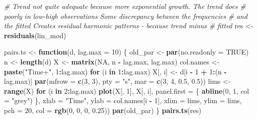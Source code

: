 \documentclass[]{book}
\newenvironment{Shaded}{\begin{snugshade}}{\end{snugshade}}
\newcommand{\CommentTok}[1]{\textcolor[rgb]{0.56,0.35,0.01}{\textit{#1}}}
\newcommand{\ControlFlowTok}[1]{\textcolor[rgb]{0.13,0.29,0.53}{\textbf{#1}}}
\newcommand{\DataTypeTok}[1]{\textcolor[rgb]{0.13,0.29,0.53}{#1}}
\newcommand{\DecValTok}[1]{\textcolor[rgb]{0.00,0.00,0.81}{#1}}
\newcommand{\FloatTok}[1]{\textcolor[rgb]{0.00,0.00,0.81}{#1}}
\newcommand{\KeywordTok}[1]{\textcolor[rgb]{0.13,0.29,0.53}{\textbf{#1}}}
\newcommand{\NormalTok}[1]{#1}
\newcommand{\OperatorTok}[1]{\textcolor[rgb]{0.81,0.36,0.00}{\textbf{#1}}}
\newcommand{\OtherTok}[1]{\textcolor[rgb]{0.56,0.35,0.01}{#1}}
\newcommand{\StringTok}[1]{\textcolor[rgb]{0.31,0.60,0.02}{#1}}
\begin{document}
\begin{Shaded}
\begin{Highlighting}[]
\CommentTok{# Trend not quite adequate because more exponential growth.  The trend does}
\CommentTok{# poorly in low-high observations Some discrepancy between the frequencies}
\CommentTok{# and the fitted Creates residual harmonic patterns - because trend minus}
\CommentTok{# fitted}
\NormalTok{res <-}\StringTok{ }\KeywordTok{residuals}\NormalTok{(lin_mod)}

\NormalTok{pairs.ts <-}\StringTok{ }\ControlFlowTok{function}\NormalTok{(d, }\DataTypeTok{lag.max =} \DecValTok{10}\NormalTok{) \{}
\NormalTok{    old_par <-}\StringTok{ }\KeywordTok{par}\NormalTok{(}\DataTypeTok{no.readonly =} \OtherTok{TRUE}\NormalTok{)}
\NormalTok{    n <-}\StringTok{ }\KeywordTok{length}\NormalTok{(d)}
\NormalTok{    X <-}\StringTok{ }\KeywordTok{matrix}\NormalTok{(}\OtherTok{NA}\NormalTok{, n }\OperatorTok{-}\StringTok{ }\NormalTok{lag.max, lag.max)}
\NormalTok{    col.names <-}\StringTok{ }\KeywordTok{paste}\NormalTok{(}\StringTok{"Time+"}\NormalTok{, }\DecValTok{1}\OperatorTok{:}\NormalTok{lag.max)}
    \ControlFlowTok{for}\NormalTok{ (i }\ControlFlowTok{in} \DecValTok{1}\OperatorTok{:}\NormalTok{lag.max) X[, i] <-}\StringTok{ }\NormalTok{d[i }\OperatorTok{-}\StringTok{ }\DecValTok{1} \OperatorTok{+}\StringTok{ }\DecValTok{1}\OperatorTok{:}\NormalTok{(n }\OperatorTok{-}\StringTok{ }\NormalTok{lag.max)]}
    \KeywordTok{par}\NormalTok{(}\DataTypeTok{mfrow =} \KeywordTok{c}\NormalTok{(}\DecValTok{3}\NormalTok{, }\DecValTok{3}\NormalTok{), }\DataTypeTok{pty =} \StringTok{"s"}\NormalTok{, }\DataTypeTok{mar =} \KeywordTok{c}\NormalTok{(}\DecValTok{3}\NormalTok{, }\DecValTok{4}\NormalTok{, }\FloatTok{0.5}\NormalTok{, }\FloatTok{0.5}\NormalTok{))}
\NormalTok{    lims <-}\StringTok{ }\KeywordTok{range}\NormalTok{(X)}
    \ControlFlowTok{for}\NormalTok{ (i }\ControlFlowTok{in} \DecValTok{2}\OperatorTok{:}\NormalTok{lag.max) }\KeywordTok{plot}\NormalTok{(X[, }\DecValTok{1}\NormalTok{], X[, i], }\DataTypeTok{panel.first =}\NormalTok{ \{}
        \KeywordTok{abline}\NormalTok{(}\DecValTok{0}\NormalTok{, }\DecValTok{1}\NormalTok{, }\DataTypeTok{col =} \StringTok{"grey"}\NormalTok{)}
\NormalTok{    \}, }\DataTypeTok{xlab =} \StringTok{"Time"}\NormalTok{, }\DataTypeTok{ylab =}\NormalTok{ col.names[i }\OperatorTok{-}\StringTok{ }\DecValTok{1}\NormalTok{], }\DataTypeTok{xlim =}\NormalTok{ lims, }\DataTypeTok{ylim =}\NormalTok{ lims, }\DataTypeTok{pch =} \DecValTok{20}\NormalTok{, }
        \DataTypeTok{col =} \KeywordTok{rgb}\NormalTok{(}\DecValTok{0}\NormalTok{, }\DecValTok{0}\NormalTok{, }\DecValTok{0}\NormalTok{, }\FloatTok{0.25}\NormalTok{))}
    \KeywordTok{par}\NormalTok{(old_par)}
\NormalTok{\}}
\KeywordTok{pairs.ts}\NormalTok{(res)}
\end{Highlighting}
\end{Shaded}
\end{document}
